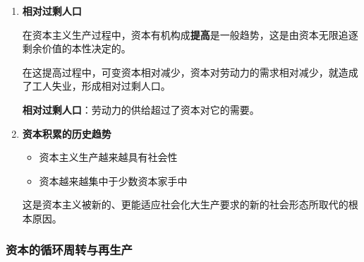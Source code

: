 \documentclass[12pt, a4paper, oneside]{ctexart}
\begin{document}
\begin{enumerate}
  \item {\bf 相对过剩人口}
  
  在资本主义生产过程中，资本有机构成\textbf{提高}是一般趋势，这是由资本无限追逐剩余价值的本性决定的。

  在这提高过程中，可变资本相对减少，资本对劳动力的需求相对减少，就造成了工人失业，形成相对过剩人口。

  \textbf{相对过剩人口}：劳动力的供给超过了资本对它的需要。

  \item {\bf 资本积累的历史趋势}
  
  \begin{itemize}
    \item 资本主义生产越来越具有社会性
    \item 资本越来越集中于少数资本家手中
  \end{itemize}

  这是资本主义被新的、更能适应社会化大生产要求的新的社会形态所取代的根本原因。
\end{enumerate}

\subsubsection{资本的循环周转与再生产}
\end{document}
